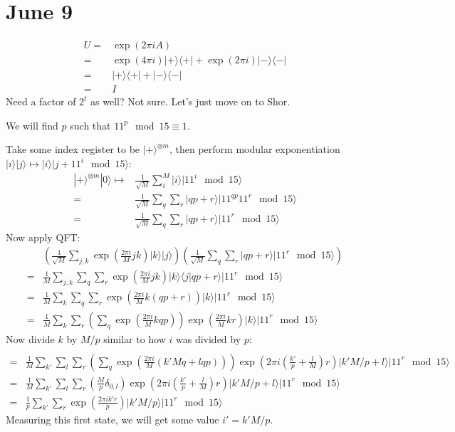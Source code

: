 \documentclass[]{article}
\newcommand{\bra}[1]{\langle #1 |}
\newcommand{\ket}[1]{| #1 \rangle}
\newcommand{\braket}[2]{\langle #1 | #2 \rangle}
\begin{document}
\section{June 9}

\begin{align*}
U=&\exp(2\pi iA)
\\=&\exp(4\pi i)\ket{+}\bra{+} + \exp(2 \pi i)\ket{-}\bra{-}
\\=& \ket{+}\bra{+} + \ket{-}\bra{-}
\\=& I
\end{align*}
Need a factor of $2^t$ as well? Not sure. Let's just move on to Shor.

We will find $p$ such that $11^p \mod 15 \equiv 1$.

Take some index register to be $\ket{+}^{\otimes m}$, then perform modular exponentiation $\ket{i}\ket{j}\mapsto\ket{i}\ket{j+11^i\mod15}$:
\begin{align*}
\ket{+}^{\otimes m}\ket{0} \mapsto& \frac{1}{\sqrt{M}}\sum_i^M \ket{i}\ket{11^i\mod 15}
\\=&\frac{1}{\sqrt{M}}\sum_q \sum_r \ket{qp+r}\ket{11^{qp}11^r\mod 15}
\\=&\frac{1}{\sqrt{M}}\sum_q \sum_r \ket{qp+r}\ket{11^r\mod 15}
\end{align*}
Now apply QFT:
\begin{align*}
&\left(\frac{1}{\sqrt{M}}\sum_{j,k}\exp\left(\frac{2\pi i}{M}jk\right)\ket{k}\ket{j}\right)
\left(\frac{1}{\sqrt{M}}\sum_q \sum_r \ket{qp+r}\ket{11^r\mod 15}\right)
\\=&\frac{1}{M}\sum_{j,k}\sum_q \sum_r\exp\left(\frac{2\pi i}{M}jk\right) \ket{k}\braket{j}{qp+r}\ket{11^r\mod 15}
\\=&\frac{1}{M}\sum_{k}\sum_q \sum_r\exp\left(\frac{2\pi i}{M}k(qp+r)\right) \ket{k}\ket{11^r\mod 15}
\\=&\frac{1}{M}\sum_{k}\sum_r
\left(\sum_q \exp\left(\frac{2\pi i}{M}kqp\right)\right)
\exp\left(\frac{2\pi i}{M}kr\right)
\ket{k}\ket{11^r\mod 15}
\end{align*}
Now divide $k$ by $M/p$ similar to how $i$ was divided by $p$:
\begin{align*}
\\=&\frac{1}{M}\sum_{k'}\sum_{l}\sum_r
\left(\sum_q \exp\left(\frac{2\pi i}{M}\left(k'Mq+lqp\right)\right)\right)
\exp\left(2\pi i\left(\frac{k'}{p}+\frac{l}{M}\right)r\right)
\ket{k'M/p+l}\ket{11^r\mod 15}
\\=&\frac{1}{M}\sum_{k'}\sum_{l}\sum_r
\left(\frac{M}{p}\delta_{0,l}\right)
\exp\left(2\pi i\left(\frac{k'}{p}+\frac{l}{M}\right)r\right)
\ket{k'M/p+l}\ket{11^r\mod 15}
\\=&\frac{1}{p}\sum_{k'}\sum_r
\exp\left(\frac{2\pi ik'r}{p}\right)
\ket{k'M/p}\ket{11^r\mod 15}
\end{align*}
Measuring this first state, we will get some value $i'=k'M/p$.
\end{document}
